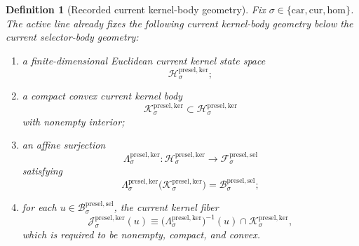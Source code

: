 \documentclass[11pt]{article}
\newcommand{\Car}{\mathrm{car}}
\newcommand{\Cur}{\mathrm{cur}}
\newcommand{\Hom}{\mathrm{hom}}
\newcommand{\PreSectionSelectorSpace}[1]{\mathcal F_{#1}^{\mathrm{presel,sel}}}
\newcommand{\PreSectionSelectorBody}[1]{\mathcal B_{#1}^{\mathrm{presel,sel}}}
\newcommand{\KernelSpace}[1]{\mathcal H_{#1}^{\mathrm{presel,ker}}}
\newcommand{\KernelBody}[1]{\mathcal K_{#1}^{\mathrm{presel,ker}}}
\newcommand{\KernelProj}[1]{\Lambda_{#1}^{\mathrm{presel,ker}}}
\newcommand{\KernelFiber}[2]{\mathcal J_{#1}^{\mathrm{presel,ker}}(#2)}
\newtheorem{definition}{Definition}
\begin{document}
\begin{definition}[Recorded current kernel-body geometry]
\label{def:kernelgeometry}
Fix \(\sigma\in\{\Car,\Cur,\Hom\}\). The active line already fixes the following current kernel-body geometry below the current selector-body geometry:
\begin{enumerate}
    \item a finite-dimensional Euclidean current kernel state space
    \[
    \KernelSpace{\sigma};
    \]
    \item a compact convex current kernel body
    \[
    \KernelBody{\sigma}\subset\KernelSpace{\sigma}
    \]
    with nonempty interior;
    \item an affine surjection
    \[
    \KernelProj{\sigma}:\KernelSpace{\sigma}\to\PreSectionSelectorSpace{\sigma}
    \]
    satisfying
    \[
    \KernelProj{\sigma}\bigl(\KernelBody{\sigma}\bigr)
    =
    \PreSectionSelectorBody{\sigma};
    \]
    \item for each \(u\in\PreSectionSelectorBody{\sigma}\), the current kernel fiber
    \[
    \KernelFiber{\sigma}{u}
    \equiv
    \bigl(\KernelProj{\sigma}\bigr)^{-1}(u)\cap\KernelBody{\sigma},
    \]
    which is required to be nonempty, compact, and convex.
\end{enumerate}
\end{definition}
\end{document}
